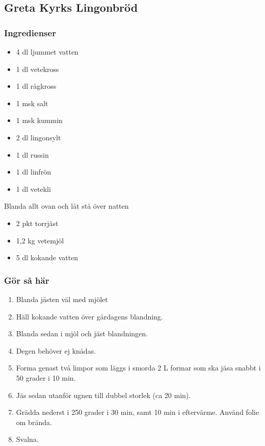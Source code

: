 \documentclass[a4paper,11pt,twocolumn]{article}
\begin{document}
\subsection{Greta Kyrks Lingonbröd}
\subsubsection*{Ingredienser}
\begin{itemize}[noitemsep]
    \item 4 dl ljummet vatten
    \item 1 dl vetekross
    \item 1 dl rågkross
    \item 1 msk salt
    \item 1 msk kummin
    \item 2 dl lingonsylt
    \item 1 dl russin
    \item 1 dl linfrön
    \item 1 dl vetekli
\end{itemize}
Blanda allt ovan och låt stå över natten
\begin{itemize}[noitemsep]
    \item 2 pkt torrjäst
    \item 1,2 kg vetemjöl
    \item 5 dl kokande vatten
\end{itemize}
\subsubsection*{Gör så här}
\begin{enumerate}[label=\arabic*.]
    \item Blanda jästen väl med mjölet
    \item Häll kokande vatten över gårdagens blandning.
    \item Blanda sedan i mjöl och jäst blandningen.
    \item Degen behöver ej knådas.
    \item Forma genast två limpor som läggs i smorda 2 L formar som ska jäsa snabbt i 50 grader i 10 min.
    \item Jäs sedan utanför ugnen till dubbel storlek (ca 20 min).
    \item Grädda nederst i 250 grader i 30 min, samt 10 min i eftervärme. Använd folie om brända.
    \item Svalna.
\end{enumerate}
\end{document}
